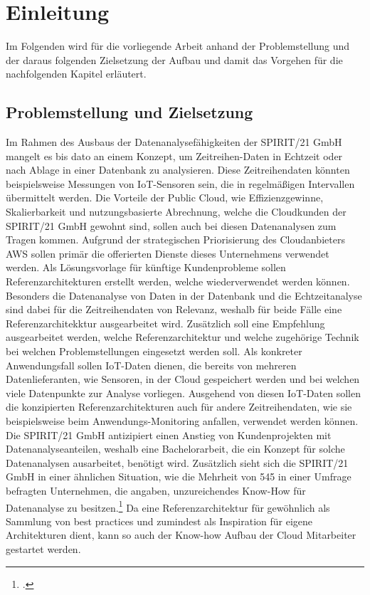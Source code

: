 \chapter{Einleitung}
Im Folgenden wird für die vorliegende Arbeit anhand der Problemstellung und der daraus folgenden Zielsetzung der Aufbau und damit das Vorgehen für die nachfolgenden Kapitel erläutert.
\section{Problemstellung und Zielsetzung}
Im Rahmen des Ausbaus der Datenanalysefähigkeiten der SPIRIT/21 GmbH mangelt es bis dato an einem Konzept, um
Zeitreihen-Daten in Echtzeit oder nach Ablage in einer Datenbank zu analysieren. 
Diese Zeitreihendaten könnten beispielsweise Messungen von \ac{IoT}-Sensoren sein, die in regelmäßigen Intervallen übermittelt werden. Die Vorteile der Public Cloud, wie Effizienzgewinne, Skalierbarkeit und nutzungsbasierte Abrechnung, welche die Cloudkunden der SPIRIT/21 GmbH gewohnt sind, sollen auch bei diesen Datenanalysen zum Tragen kommen. 
Aufgrund der strategischen Priorisierung des Cloudanbieters \acf{AWS} sollen primär die offerierten Dienste dieses Unternehmens verwendet werden.
Als Lösungsvorlage für künftige Kundenprobleme sollen Referenzarchitekturen erstellt werden, welche wiederverwendet werden können. 
Besonders die Datenanalyse von Daten in der Datenbank und die Echtzeitanalyse sind dabei für die
Zeitreihendaten von Relevanz, weshalb für beide Fälle eine Referenzarchitekktur ausgearbeitet wird.
Zusätzlich soll eine Empfehlung ausgearbeitet werden, welche Referenzarchitektur und welche
zugehörige Technik bei welchen Problemstellungen eingesetzt werden soll. Als konkreter Anwendungsfall sollen \ac{IoT}-Daten dienen, die bereits von mehreren Datenlieferanten, wie Sensoren, in der Cloud gespeichert werden und bei welchen viele Datenpunkte zur Analyse vorliegen. Ausgehend von diesen \ac{IoT}-Daten sollen die konzipierten Referenzarchitekturen auch für andere Zeitreihendaten, wie sie beispielsweise beim Anwendungs-Monitoring anfallen, verwendet werden können. 
Die SPIRIT/21 GmbH antizipiert einen Anstieg von Kundenprojekten mit Datenanalyseanteilen, weshalb eine Bachelorarbeit, die ein Konzept für solche Datenanalysen ausarbeitet, benötigt wird. Zusätzlich sieht sich die SPIRIT/21 GmbH in einer ähnlichen Situation, wie die Mehrheit von 545 in einer Umfrage befragten Unternehmen, die angaben, unzureichendes Know-How für Datenanalyse zu besitzen.\footcite[Vgl.][]{o.V..o.J.} Da eine Referenzarchitektur für gewöhnlich als Sammlung von best practices und zumindest als Inspiration für eigene Architekturen dient, kann so auch der Know-how Aufbau der Cloud Mitarbeiter gestartet werden.

